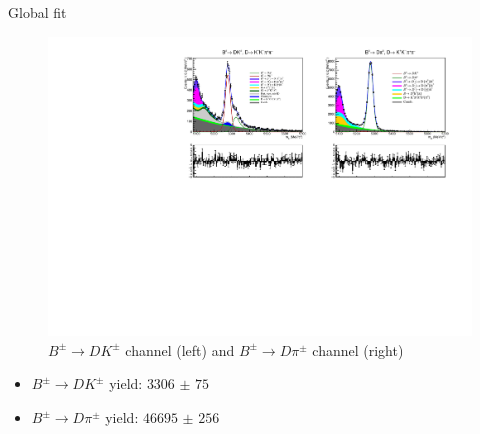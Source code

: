 \documentclass{beamer}
\begin{document}
\begin{frame}{Global fit}
  \begin{figure}
    \centering
    \includegraphics[width = 1.0\textwidth]{Plots/d2kkpipi_fiveL_allDP.pdf}
    \caption{$B^\pm\to DK^\pm$ channel (left) and $B^\pm\to D\pi^\pm$ channel (right)}
  \end{figure}
  \vspace{-0.5cm}
  \begin{itemize}
    \item{$B^\pm\to DK^\pm$ yield: $\SI{3306(75)}{}$}
    \item{$B^\pm\to D\pi^\pm$ yield: $\SI{46695(256)}{}$}
  \end{itemize}
\end{frame}
\end{document}
